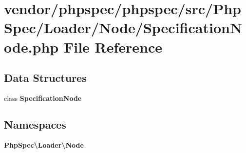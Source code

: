 \section{vendor/phpspec/phpspec/src/\+Php\+Spec/\+Loader/\+Node/\+Specification\+Node.php File Reference}
\label{_specification_node_8php}
\subsection*{Data Structures}
\begin{DoxyCompactItemize}
\item 
class {\bf Specification\+Node}
\end{DoxyCompactItemize}
\subsection*{Namespaces}
\begin{DoxyCompactItemize}
\item 
 {\bf Php\+Spec\textbackslash{}\+Loader\textbackslash{}\+Node}
\end{DoxyCompactItemize}
